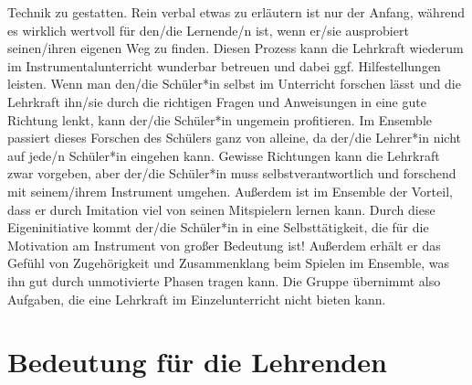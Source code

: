 Technik zu gestatten. Rein verbal etwas zu erläutern ist nur der Anfang, während
es wirklich wertvoll für den/die Lernende/n ist, wenn er/sie ausprobiert
seinen/ihren eigenen Weg zu finden. Diesen Prozess kann die Lehrkraft wiederum im
Instrumentalunterricht wunderbar betreuen und dabei ggf. Hilfestellungen
leisten. Wenn man den/die Schüler*in selbst im Unterricht forschen lässt und die
Lehrkraft ihn/sie durch die richtigen Fragen und Anweisungen in eine gute
Richtung lenkt, kann der/die Schüler*in ungemein profitieren. Im Ensemble passiert
dieses Forschen des Schülers ganz von alleine, da der/die Lehrer*in
nicht auf jede/n Schüler*in eingehen kann. Gewisse Richtungen kann
die Lehrkraft zwar vorgeben, aber der/die Schüler*in muss selbstverantwortlich
und forschend mit seinem/ihrem Instrument umgehen. Außerdem ist im Ensemble der
Vorteil, dass er durch Imitation viel von seinen Mitspielern lernen kann. Durch
diese Eigeninitiative kommt der/die Schüler*in in eine Selbsttätigkeit, die für
die Motivation am Instrument von großer Bedeutung ist! Außerdem erhält er das
Gefühl von Zugehörigkeit und Zusammenklang beim Spielen im Ensemble, was ihn
gut durch unmotivierte Phasen tragen kann. Die Gruppe übernimmt also Aufgaben,
die eine Lehrkraft im Einzelunterricht nicht bieten kann.



\section{Bedeutung für die Lehrenden}

